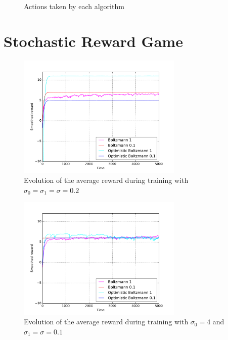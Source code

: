 \documentclass[a4paper]{article}
\begin{document}
\begin{figure}[H]
	\caption{Actions taken by each algorithm}
	\label{ex13a}
\end{figure}

\section{Stochastic Reward Game}
\begin{figure}[H]
	\centering
	\includegraphics[width=0.7\textwidth]{./fig/ex2-0.pdf}
	\caption{Evolution of the average reward during training with 
		$\sigma_0 = \sigma_1 = \sigma = 0.2$}
	\label{ex31perf}
\end{figure}
\begin{figure}[H]
	\centering
	\includegraphics[width=0.7\textwidth]{./fig/ex2-1.pdf}
	\caption{Evolution of the average reward during training with
		$\sigma_0 = 4$ and $\sigma_1 = \sigma = 0.1$}
	\label{ex32perf}
\end{figure}
\end{document}
